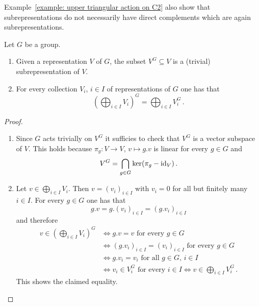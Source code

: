 \begin{warning}
  Example~\ref{example: upper triangular action on C2} also show that subrepresentations do not necessarily have direct complements which are again subrepresentations.
\end{warning}


\begin{lemma}\label{lemma: direct sum and invariants commute}
  Let $G$ be a group.
  \begin{enumerate}[label=\alph*)]
    \item
      Given a representation $V$ of $G$, the subset $V^G \subseteq V$ is a (trivial) subrepresentation of $V$.
    \item
      For every collection $V_i$, $i \in I$ of representations of $G$ one has that
      \[
          \left(
            \bigoplus_{i \in I} V_i
          \right)^G
        = \bigoplus_{i \in I} V_i^G \,.
      \]
  \end{enumerate}
\end{lemma}
\begin{proof}
  \begin{enumerate}[label=\alph*)]
    \item
      Since $G$ acts trivially on $V^G$ it sufficies to check that $V^G$ is a vector subspace of $V$.
      This holds because $\pi_g \colon V \to V$, $v \mapsto g.v$ is linear for every $g \in G$ and
      \[
          V^G
        = \bigcap_{g \in G} \ker(\pi_g - \operatorname{id}_V) \,.
      \]
    \item
      Let $v \in \bigoplus_{i \in I} V_i$.
      Then $v = (v_i)_{i \in I}$ with $v_i = 0$ for all but finitely many $i \in I$.
      For every $g \in G$ one has that
      \[
          g.v
        = g.(v_i)_{i \in I}
        = (g.v_i)_{i \in I}
      \]
      and therefore
      \begin{align*}
              v \in \left( \bigoplus_{i \in I} V_i \right)^G
        &\iff \text{$g.v = v$ for every $g \in G$}  \\
        &\iff \text{$(g.v_i)_{i \in I} = (v_i)_{i \in I}$ for every $g \in G$} \\
        &\iff \text{$g.v_i = v_i$ for all $g \in G$, $i \in I$} \\
        &\iff \text{$v_i \in V_i^G$ for every $i \in I$}
         \iff v \in \bigoplus_{i \in I} V_i^G \,.
      \end{align*}
      This shows the claimed equality.
  \qedhere
  \end{enumerate}
\end{proof}





